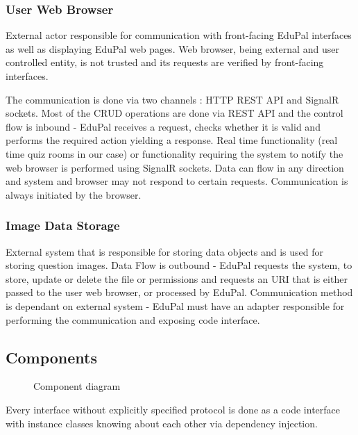 \subsubsection{User Web Browser}

External actor responsible for communication with front-facing EduPal interfaces as well as displaying EduPal web pages. Web browser, being external and user controlled entity, is not trusted and its requests are verified by front-facing interfaces.

The communication is done via two channels : HTTP REST API and SignalR sockets. Most of the CRUD operations are done via REST API and the control flow is inbound - EduPal receives a request, checks whether it is valid and performs the required action yielding a response. Real time functionality (real time quiz rooms in our case) or functionality requiring the system to notify the web browser is performed using SignalR sockets. Data can flow in any direction and system and browser may not respond to certain requests. Communication is always initiated by the browser.

\subsubsection{Image Data Storage}

External system that is responsible for storing data objects and is used for storing question images. Data Flow is outbound - EduPal requests the system, to store, update or delete the file or permissions and requests an URI that is either passed to the user web browser, or processed by EduPal. Communication method is dependant on external system - EduPal must have an adapter responsible for performing the communication and exposing code interface.

\subsection{Components}

\begin{figure}[H]
  \label{fig:viewpoint-functional-components}
  \caption{Component diagram}
\end{figure}

Every interface without explicitly specified protocol is done as a code interface with instance classes knowing about each other via dependency injection.

